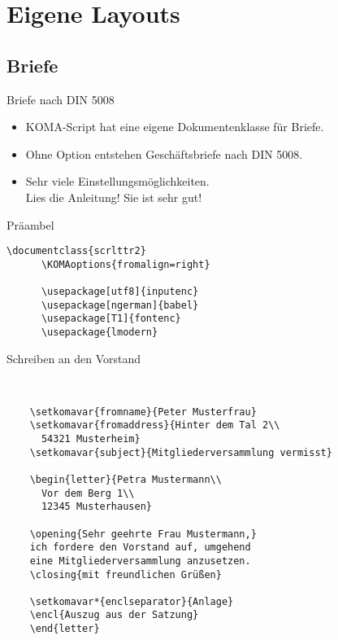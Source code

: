 \section{Eigene Layouts}

\subsection{Briefe}

\begin{Frame}[fragile]{Briefe nach DIN 5008}
  \begin{itemize}
    \item KOMA-Script hat eine eigene Dokumentenklasse für Briefe.
    \item Ohne Option entstehen Geschäftsbriefe nach DIN 5008.
    \item Sehr viele Einstellungsmöglichkeiten. \\
      \alert{Lies die Anleitung! Sie ist sehr gut!}
  \end{itemize}

  \xxx

  \begin{Block}{Präambel}
    \begin{lstlisting}[style=block,gobble=6]
      \documentclass{scrlttr2}
      \KOMAoptions{fromalign=right}
 
      \usepackage[utf8]{inputenc}
      \usepackage[ngerman]{babel}
      \usepackage[T1]{fontenc}
      \usepackage{lmodern}
     \end{lstlisting}
  \end{Block}
\end{Frame}

\begin{Frame}[fragile]{Schreiben an den Vorstand}
  \begin{lstlisting}[gobble=4]
    

    \setkomavar{fromname}{Peter Musterfrau}
    \setkomavar{fromaddress}{Hinter dem Tal 2\\
      54321 Musterheim}
    \setkomavar{subject}{Mitgliederversammlung vermisst}
    
    \begin{letter}{Petra Mustermann\\
      Vor dem Berg 1\\
      12345 Musterhausen}
    
    \opening{Sehr geehrte Frau Mustermann,}
    ich fordere den Vorstand auf, umgehend
    eine Mitgliederversammlung anzusetzen.
    \closing{mit freundlichen Grüßen}
    
    \setkomavar*{enclseparator}{Anlage}
    \encl{Auszug aus der Satzung}
    \end{letter}
    
    
  \end{lstlisting}
\end{Frame}

